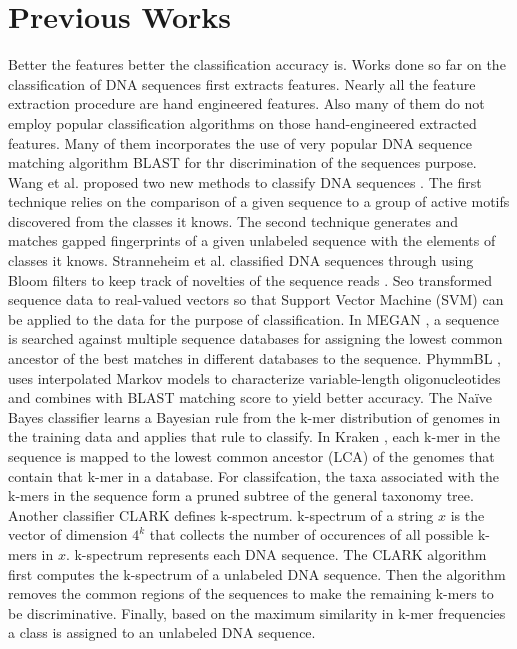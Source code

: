 \documentclass[oneside, twocolumn, a4paper, 10pt]{IEEEtran}
\begin{document}
\section{Previous Works}
Better the features better the classification accuracy is. Works done so far on the classification of DNA sequences first extracts features. Nearly all the feature extraction procedure are hand engineered features. Also many of them do not employ popular classification algorithms on those hand-engineered extracted features. Many of them incorporates the use of very popular DNA sequence matching algorithm BLAST for thr discrimination of the sequences purpose. Wang et al. proposed two new methods to classify DNA sequences \cite{2}. The first technique relies on the comparison of a given sequence to a group of active motifs discovered from the classes it knows. The second technique generates and matches gapped fingerprints of a given unlabeled sequence with the elements of classes it knows. Stranneheim et al. classified DNA sequences through using Bloom filters to keep track of novelties of the sequence reads \cite{3}. Seo transformed sequence data to real-valued vectors so that Support Vector Machine (SVM) can be applied \cite{4} to the data for the purpose of classification. In MEGAN \cite{5}, a sequence is searched against multiple sequence databases for assigning the lowest common ancestor of the best matches in different databases to the sequence. PhymmBL \cite{6}, \cite{7} uses interpolated Markov models to characterize variable-length oligonucleotides and combines with BLAST matching score to yield better accuracy. The Na\"{i}ve Bayes classifier \cite{8} learns a Bayesian rule from the k-mer distribution of genomes in the training data and applies that rule to classify. In Kraken \cite{9}, each k-mer in the sequence is mapped to the lowest common ancestor (LCA) of the genomes that contain that k-mer in a database. For classifcation, the taxa associated with the k-mers in the sequence form a pruned subtree of the general taxonomy tree. Another classifier CLARK \cite{10} defines k-spectrum. k-spectrum of a string $x$ is the vector of dimension $4^k$ that collects the number of occurences of all possible k-mers in $x$. k-spectrum represents each DNA sequence. The CLARK algorithm first computes the k-spectrum of a unlabeled DNA sequence. Then the algorithm removes the common regions of the sequences to make the remaining k-mers to be discriminative. Finally, based on the maximum similarity in k-mer frequencies a class is assigned to an unlabeled DNA sequence.\\
\end{document}
